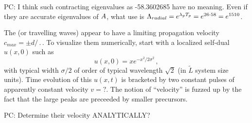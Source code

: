 PC: {I think such contracting eigenvalues as -58.3602685 have no meaning.
Even if they are accurate eigenvalues of $A$,
what use is
$\Lambda_{radial} =  e^{\lambda_p {T_{p}}} = e^{26\cdot58} = e^{1510}$.
        }

The \reqva (or travelling waves) appear to have a limiting propagation
velocity $c_{max} = \pm d/\period{}$.
To visualize them numerically,
start with a localized self-dual $u(x,0)$ such as
\[
u(x,0) = x e^{- x^2/2\sigma^2}
\,,
\]
with typical width $\sigma/2$ of order of typical wavelength
$\sqrt{2}$ (in $\tilde{L}$ system size units).
Time evolution of this  $u(x,t)$ is bracketed by two constant
pulses of apparently constant velocity $v=?$.
The notion of ``velocity''
is fuzzed up by the fact that the large peaks are preceeded
by smaller precursors.

PC: {Determine their velocity ANALYTICALLY?}

